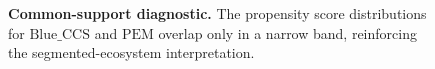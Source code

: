 \documentclass[11pt,a4paper]{article}
\newcommand{\BlueCCS}{\mathrm{Blue\_CCS}}
\newcommand{\PEM}{\mathrm{PEM}}
\begin{document}
\begin{figure}[H]
\centering
{}
\caption{\textbf{Common-support diagnostic.} The propensity score distributions for $\BlueCCS$ and $\PEM$ overlap only in a narrow band, reinforcing the segmented-ecosystem interpretation.}
\label{fig:common_support}
\end{figure}
\end{document}
